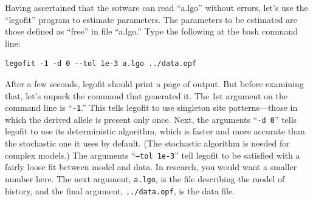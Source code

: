 \documentclass[11pt]{article}
\begin{document}
Having ascertained that the sotware can read ``a.lgo'' without errors,
let's use the ``legofit'' program to estimate parameters. The
parameters to be estimated are those defined as ``free'' in file
``a.lgo.'' Type the following at the bash command line:
\begin{verbatim}
legofit -1 -d 0 --tol 1e-3 a.lgo ../data.opf
\end{verbatim}
After a few seconds, legofit should print a page of output. But before
examining that, let's unpack the command that generated it. The 1st
argument on the command line is ``\texttt{-1}.'' This tells legofit to
use singleton site patterns---those in which the derived allele is
present only once. Next, the arguments ``\texttt{-d 0}'' tells legofit
to use its deterministic algorithm, which is faster and more accurate
than the stochastic one it uses by default. (The stochastic algorithm
is needed for complex models.) The arguments ``\texttt{--tol 1e-3}''
tell legofit to be satisfied with a fairly loose fit between model and
data. In research, you would want a smaller number here. The next
argument, \texttt{a.lgo}, is the file describing the model of history,
and the final argument, \texttt{../data.opf}, is the data file.
\end{document}
